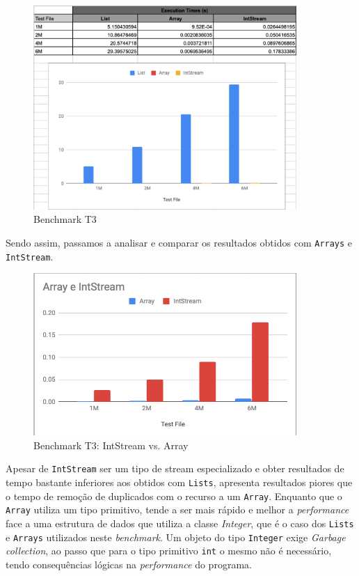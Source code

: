 \documentclass{article}
\begin{document}
\begin{figure}[H]
    \centering
    \includegraphics[width=10cm]{Pictures/T3.png}
    \caption{Benchmark T3}
\end{figure}

Sendo assim, passamos a analisar e comparar os resultados obtidos com \texttt{Arrays} e \texttt{IntStream}.

\begin{figure}[H]
    \centering
    \includegraphics[width=10cm]{Pictures/T3_2.png}
    \caption{Benchmark T3: IntStream vs. Array}
\end{figure}

Apesar de \texttt{IntStream} ser um tipo de stream especializado e obter resultados de tempo bastante inferiores aos obtidos com \texttt{Lists}, apresenta resultados piores que o tempo de remoção de duplicados com o recurso a um \texttt{Array}. Enquanto que o \texttt{Array} utiliza um tipo primitivo, tende a ser mais rápido e melhor a \textit{performance} face a uma estrutura de dados que utiliza a classe \textit{Integer}, que é o caso dos \texttt{Lists} e \texttt{Arrays} utilizados neste \textit{benchmark}. Um objeto do tipo \texttt{Integer} exige \textit{Garbage collection}, ao passo que para o tipo primitivo \texttt{int} o mesmo não é necessário, tendo consequências lógicas na \textit{performance} do programa.
\end{document}
